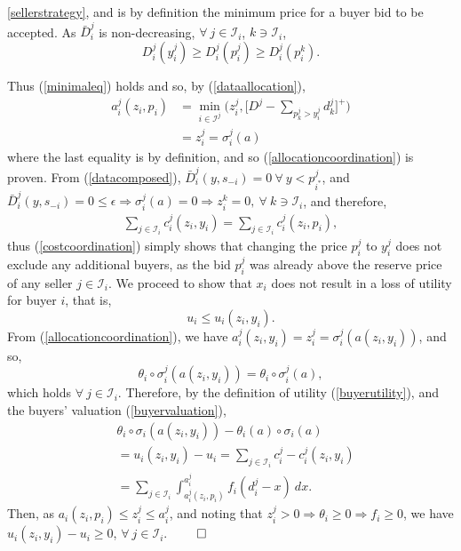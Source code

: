 \documentclass[sigconf, anonymous]{acmart}
\newcommand{\mcI}{\mathcal{I}}
\newcommand{\g}{\sigma}
\theoremstyle{definition}
\begin{document}
\ref{sellerstrategy}, and is by definition the minimum price for a buyer bid to
be accepted. 
As $\bar{D}_i^j$ is non-decreasing, $\forall \ j\in \mcI_i$,
$k\ni\mcI_i$,
$$
    D_i^j(y_i^j) \ge D_i^j(p_i^{j})\ge D_i^j(p_i^{k}).
$$
\iffalse
Furthermore, suppose there exists buyer $k\in \mcI^j$, such that
$\g_k^{j}(a) \ge \g_i^{j}(a)$ and $D^j - \sum_{k\in\mcI^j,k\ne i}d_k^j < z_i^{j}$, resulting in a
partial allocation. Bid $s_k^j \in s_{-i}$, and so is considered in buyer $i$'s strategy. 
As buyer $i$ is allowed to choose subset $\mcI_i$, and $\mcI_i$ is a minimal
set, (\ref{buyercoordinate}) states that $n$ is such that $\g_i^{j}(a)
\ge \g_k^{j}(a)$ for any $k\in\mcI$, therefore such a buyer $k$ cannot exist.
We have, $\forall \ j\in \mcI_i$, $k\ni\mcI_i$,
$$
    {\theta_i}'(\g_i^{k}(a)) \ge {\theta_i}'(\g_i^{j}(a)) \ge y_i^j.
$$
Now, suppose that $p_k^j = p_i^j$, however $d_k^j > d_i^j$...
\fi
Thus (\ref{minimaleq}) holds and so, by (\ref{dataallocation}),
\begin{align*}
     a_i^j(z_i,p_i) &=\min_{i\in\mcI^j}\bigg(z_i^j, \bigg\lbrack D^{j} - \sum_{p_k^{j}> y_i^{j}}
d_k^{j}\bigg\rbrack^+\bigg) \\
    &= z_i^{j}= \g_i^{j}(a)
\end{align*}
where the last equality is by definition, and so (\ref{allocationcoordination}) is proven.
From (\ref{datacomposed}), $\bar{D}_i^j(y, s_{-i}) =
0 \ \forall \ y < p_{i^*}^j$, and $\bar{D}_i^j(y, s_{-i}) =0 \le \epsilon
\Rightarrow \g_i^j(a) = 0 \Rightarrow z_i^k = 0, \ \forall \ k \ni \mcI_i$, and therefore,
\begin{align*}
    \displaystyle\sum_{j\in\mcI_i} c_i^j(z_i,y_i) =\sum_{j\in\mcI_i}
c_i^j(z_i,p_i),
\end{align*}
thus (\ref{costcoordination}) simply shows that changing the price $p^j_i$ to $y^j_i$ does not exclude any
additional buyers, as the bid $p^j_i$ was already above the reserve price of any
seller $j \in \mcI_i$.
We proceed to show that $x_i$ does not result in a loss of utility for
buyer $i$, that is,
$$
    u_i \le u_i(z_i,y_i).
$$
From (\ref{allocationcoordination}), we have $a_i^{j}(z_i,y_i) = z_i^{j} = \g_i^j(a(z_i,y_i))$, 
and so,
$$
    \theta_i\circ \g_i^j(a(z_i,y_i)) = \theta_i\circ \g_i^j(a),
$$ 
which holds $\forall \ j\in\mcI_i$.
Therefore, by the definition of utility (\ref{buyerutility}),
and the buyers' valuation (\ref{buyervaluation}), 
\begin{align*}
    &\theta_i\circ \g_i(a(z_i,y_i)) - \theta_i(a)\circ \g_i(a) \\
    &= u_i(z_i,y_i) - u_i =  \displaystyle\sum_{j\in\mcI_i} c_i^j -c_i^{j}(z_i,y_i)\\
    &= \sum_{j\in\mcI_i}\int_{a_i^j(z_i,p_i)}^{a_i^j} f_i(d_i^j - x) \ dx.
\end{align*}
Then, as $a_i(z_i,p_i) \le z_i^j \le a_i^j $, and noting that
$z_i^j>0\Rightarrow \theta_i\ge 0\Rightarrow f_i\ge 0$, we have $u_i(z_i,y_i) - u_i \ge 0$, $\forall \ j\in\mcI_i$.
$\qed$
\end{document}
